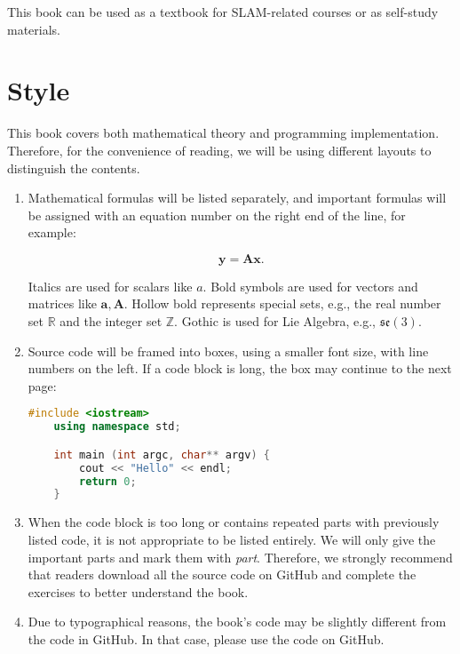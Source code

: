 This book can be used as a textbook for SLAM-related courses or as self-study materials.

\section{Style}

This book covers both mathematical theory and programming implementation. Therefore, for the convenience of reading, we will be using different layouts to distinguish the contents.

\begin{enumerate}
	\item Mathematical formulas will be listed separately, and important formulas will be assigned with an equation number on the right end of the line, for example:
	
	\begin{equation}
	\mathbf{y} =\mathbf{A}\mathbf{x}.
	\end{equation}
	
	Italics are used for scalars like $a$. Bold symbols are used for vectors and matrices like $\mathbf{a}, \mathbf{A}$. Hollow bold represents special sets, e.g., the real number set $\mathbb{R}$ and the integer set $\mathbb{Z}$. Gothic is used for Lie Algebra, e.g., $\mathfrak{se}(3)$.
	
	\item Source code will be framed into boxes, using a smaller font size, with line numbers on the left. If a code block is long, the box may continue to the next page:
	\begin{lstlisting}[language=C++,caption=Code example:]
	#include <iostream>
	using namespace std;

	int main (int argc, char** argv) {
		cout << "Hello" << endl;
		return 0;
	}
	\end{lstlisting}
	
	\item When the code block is too long or contains repeated parts with previously listed code, it is not appropriate to be listed entirely. We will only give the important parts and mark them with \textit{part}. Therefore, we strongly recommend that readers download all the source code on GitHub and complete the exercises to better understand the book.
	
	\item Due to typographical reasons, the book's code may be slightly different from the code in GitHub. In that case, please use the code on GitHub.
	

\end{enumerate}
